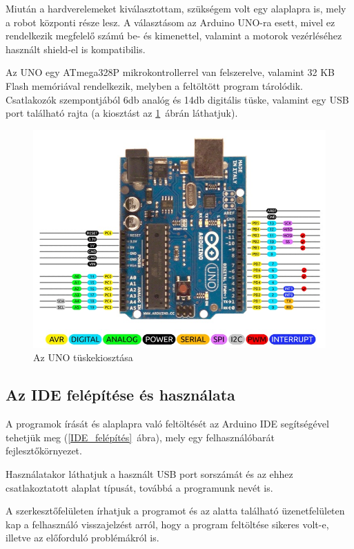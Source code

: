 \documentclass[]{thesis-ekf}
\theoremstyle{definition}
\begin{document}
Miután a hardverelemeket kiválasztottam, szükségem volt egy alaplapra is, mely a robot központi része lesz. A választásom az Arduino UNO-ra esett, mivel ez rendelkezik megfelelő számú be- és kimenettel, valamint a motorok vezérléséhez használt shield-el is kompatibilis.

Az UNO egy ATmega328P mikrokontrollerrel van felszerelve, valamint 32 KB Flash memóriával rendelkezik, melyben a feltöltött program tárolódik. Csatlakozók szempontjából 6db analóg és 14db digitális tüske, valamint egy USB port található rajta (a kiosztást az \ref{uno_pins}~ábrán láthatjuk).
\begin{figure}[h]
	\centering
	\includegraphics[width=\linewidth]{images/arduino/Uno_Pins}
	\caption{Az UNO tüskekiosztása}
	\label{uno_pins}
\end{figure}
\subsection{Az IDE felépítése és használata}\label{arduino-IDE}
A programok írását és alaplapra való feltöltését az Arduino IDE segítségével tehetjük meg (\ref{IDE_felépítés}~ábra), mely egy felhasználóbarát fejlesztőkörnyezet.

Használatakor láthatjuk a használt USB port sorszámát és az ehhez csatlakoztatott alaplat típusát, továbbá a programunk nevét is.

A szerkesztőfelületen írhatjuk a programot és az alatta található üzenetfelületen kap a felhasználó visszajelzést arról, hogy a program feltöltése sikeres volt-e, illetve az előforduló problémákról is.
\end{document}
